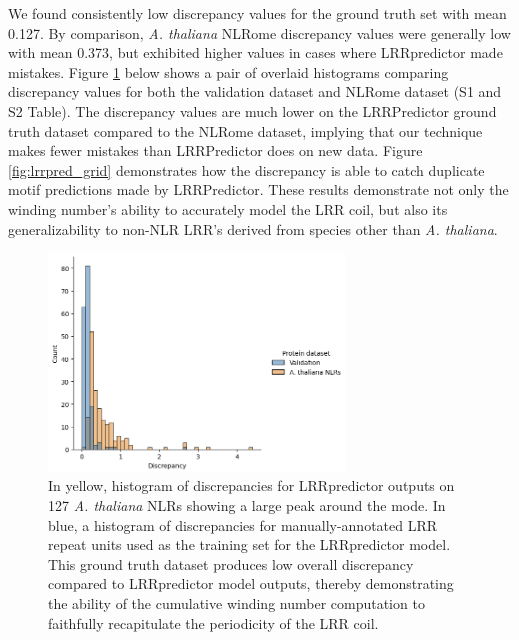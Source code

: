 \documentclass[authoryear]{article}
\begin{document}
We found consistently low discrepancy values for the ground truth set with mean 0.127. By comparison, \emph{A. thaliana} NLRome discrepancy values were generally low with mean 0.373, but exhibited higher values in cases where LRRpredictor made mistakes. Figure \ref{fig:lrrpred_hist} below shows a pair of overlaid histograms comparing discrepancy values for both the validation dataset and NLRome dataset (S1 and S2 Table). The discrepancy values are much lower on the LRRPredictor ground truth dataset compared to the NLRome dataset, implying that our technique makes fewer mistakes than LRRPredictor does on new data. Figure \ref{fig:lrrpred_grid} demonstrates how the discrepancy is able to catch duplicate motif predictions made by LRRPredictor. These results demonstrate not only the winding number's ability to accurately model the LRR coil, but also its generalizability to non-NLR LRR's derived from species other than \emph{A. thaliana}.

\begin{figure}[h!]
 \centering
 \includegraphics[width=0.7\textwidth]{discrep_hist}
 \caption{In yellow, histogram of discrepancies for LRRpredictor outputs on 127 \emph{A. thaliana} NLRs showing a large peak around the mode. In blue, a histogram of discrepancies for manually-annotated LRR repeat units used as the training set for the LRRpredictor model. This ground truth dataset produces low overall discrepancy compared to LRRpredictor model outputs, thereby demonstrating the ability of the cumulative winding number computation to faithfully recapitulate the periodicity of the LRR coil.}%
 \label{fig:lrrpred_hist}
\end{figure}
\end{document}
